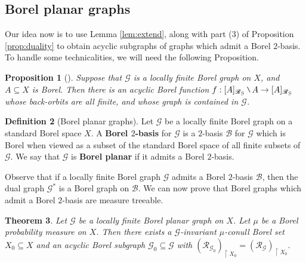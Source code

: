 \documentclass[11pt]{amsart}
\theoremstyle{definition}
\newtheorem{definition}{Definition}[section]
\theoremstyle{plain}
\newtheorem{theorem}[definition]{Theorem}
\newtheorem{proposition}[definition]{Proposition}
\newcommand{\<}{\langle}
\renewcommand{\>}{\rangle}
\newcommand{\mc}[1]{\mathcal{#1}}
\newcommand{\ra}{\rightarrow}
\newcommand{\Ggraph}{\mathcal{G}}
\newcommand{\define}[1]{\textbf{#1}}
\newcommand\RR{\mathscr{R}}
\newcommand{\mysetminusD}{\hbox{\tikz{\draw[line width=0.6pt,line cap=round] (3pt,0) -- (0,6pt);}}}
\newcommand{\mysetminusT}{\mysetminusD}
\newcommand{\mysetminusS}{\hbox{\tikz{\draw[line width=0.45pt,line cap=round] (2pt,0) -- (0,4pt);}}}
\newcommand{\mysetminusSS}{\hbox{\tikz{\draw[line width=0.4pt,line cap=round] (1.5pt,0) -- (0,3pt);}}}
\newcommand{\mysetminus}{\mathbin{\mathchoice{\mysetminusD}{\mysetminusT}{\mysetminusS}{\mysetminusSS}}}%
\begin{document}
\subsection{Borel planar graphs}
Our idea now is to use Lemma \ref{lem:extend}, along with part (3) of Proposition \ref{prop:duality} to obtain acyclic subgraphs of graphs which admit a Borel $2$-basis. To handle some technicalities, we will need the following Proposition.

\begin{proposition}[\cite{CMT-D}]\label{prop:backorbit}
Suppose that ${\Ggraph}$ is a locally finite Borel graph on $X$, and $A\subseteq X$ is Borel. Then there is an acyclic Borel function $f:[A]_{\RR_{\Ggraph}}\mysetminus A \ra [A]_{\RR_{\Ggraph}}$ whose back-orbits are all finite, and whose graph is contained in ${\Ggraph}$.
\end{proposition}

\begin{definition}[Borel planar graphs] \label{def:BorelPlanar}
Let $\Ggraph$ be a locally finite Borel graph on a standard Borel space $X$. A \define{Borel $2$-basis} for $\Ggraph$ is a $2$-basis $\mathcal{B}$ for $\Ggraph$ which is Borel when viewed as a subset of the standard Borel space of all finite subsets of $\Ggraph$. We say that $\Ggraph$ is \define{Borel planar} if it admits a Borel $2$-basis.
\end{definition}

Observe that if a locally finite Borel graph ${\Ggraph}$ admits a Borel $2$-basis $\mc{B}$, then the dual graph ${\Ggraph}^*$ is a Borel graph on $\mc{B}$.
We can now prove that Borel graphs which admit a Borel $2$-basis are measure treeable.

\begin{theorem}\label{thm:planar}
Let ${\Ggraph}$ be a locally finite Borel planar graph on $X$.
Let $\mu$ be a Borel probability measure on $X$. Then there exists a $\Ggraph$-invariant $\mu$-conull Borel set $X_0\subseteq X$ and an acyclic Borel subgraph ${\Ggraph}_0\subseteq {\Ggraph}$ with $(\RR_{\Ggraph_0})_{\restriction X_0}=(\RR_{\Ggraph})_{\restriction X_0}$.
\end{theorem}
\end{document}
